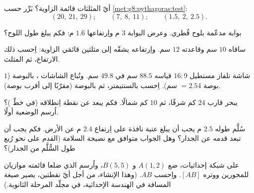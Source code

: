 \begin{exercise}[$\star$]\label{exo:g8:pythagoras:4}
أيّ المثلثات قائمة الزاوية؟ بَرِّر حسب
\cref{met:g8:pythagoras:test}:
\[
(20,\ 21,\ 29); \qquad
(7,\ 8,\ 11); \qquad
(1.5,\ 2,\ 2.5).
\]
\end{exercise}

\begin{exercise}[$\star$]\label{exo:g8:pythagoras:5}
بوابة مدعّمة بلوح قُطري. وعرض البوابة $3$ م
واِرتفاعها $1.6$ م: فكم يبلغ طول اللوح؟
\end{exercise}

\begin{exercise}[$\star$]\label{exo:g8:pythagoras:6}
 ساقاه $10$ سم وقاعدته $12$ سم.
واِرتفاعه يشقّه إلى مثلثين قائمَي الزاوية: اِحسب ذلك الارتفاع،
ثم  المثلث.
\end{exercise}

\begin{exercise}[$\star\star$]\label{exo:g8:pythagoras:7}
شاشة تلفاز مستطيل $16{:}9$ قياسه $88.5$ سم في
$49.8$ سم. وتُباع الشاشات ، بالبوصة
($1$ بوصة $= 2.54$ سم). اِحسب  بالسنتيمتر، ثم بالبوصة
(مقرّبًا إلى أقرب بوصة).
\end{exercise}

\begin{exercise}[$\star\star$]\label{exo:g8:pythagoras:8}
يبحر قارب $24$ كم شرقًا، ثم $10$ كم شمالًا. فكم يبعد عن
نقطة اِنطلاقه (في خطّ )؟ اُرسم الوضعية أولًا.
\end{exercise}

\begin{exercise}[$\star\star$]\label{exo:g8:pythagoras:9}
سُلَّم طوله $2.5$ م يجب أن يبلغ عتبة نافذة على اِرتفاع $2.4$ م عن الأرض.
فكم يجب أن تبعد قدمه عن الجدار؟ وهل الجواب
متوافق مع نصيحة السلامة (القدم على نحو رُبع طول
السُّلَّم من الجدار)؟
\end{exercise}

\begin{exercise}[$\star\star$]\label{exo:g8:pythagoras:10}
على شبكة إحداثيات، ضع $A(1, 2)$ و $B(5, 5)$، واُرسم
 الذي ضلعا قائمته موازيان للمحورين ووتره
$[AB]$. واِحسب $AB$. (وهذا الإنشاء، من أجل أيّ نقطتين، يصير
صيغة المسافة في الهندسة الإحداثية، في مجلّد المرحلة
الثانوية.)
\end{exercise}

